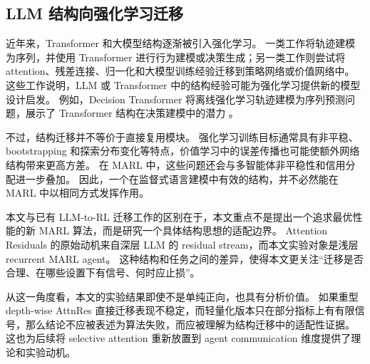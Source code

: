 \subsection{LLM 结构向强化学习迁移}

近年来，Transformer 和大模型结构逐渐被引入强化学习。
一类工作将轨迹建模为序列，并使用 Transformer 进行行为建模或决策生成；另一类工作则尝试将 attention、残差连接、归一化和大模型训练经验迁移到策略网络或价值网络中。
这些工作说明，LLM 或 Transformer 中的结构经验可能为强化学习提供新的模型设计启发。
例如，Decision Transformer 将离线强化学习轨迹建模为序列预测问题，展示了 Transformer 结构在决策建模中的潜力 \cite{chen2021decisiontransformer}。

不过，结构迁移并不等价于直接复用模块。
强化学习训练目标通常具有非平稳、bootstrapping 和探索分布变化等特点，价值学习中的误差传播也可能使额外网络结构带来更高方差。
在 MARL 中，这些问题还会与多智能体非平稳性和信用分配进一步叠加。
因此，一个在监督式语言建模中有效的结构，并不必然能在 MARL 中以相同方式发挥作用。

本文与已有 LLM-to-RL 迁移工作的区别在于，本文重点不是提出一个追求最优性能的新 MARL 算法，而是研究一个具体结构思想的适配边界。
Attention Residuals 的原始动机来自深层 LLM 的 residual stream，而本文实验对象是浅层 recurrent MARL agent。
这种结构和任务之间的差异，使得本文更关注“迁移是否合理、在哪些设置下有信号、何时应止损”。

从这一角度看，本文的实验结果即使不是单纯正向，也具有分析价值。
如果重型 depth-wise AttnRes 直接迁移表现不稳定，而轻量化版本只在部分指标上有有限信号，那么结论不应被表述为算法失败，而应被理解为结构迁移中的适配性证据。
这也为后续将 selective attention 重新放置到 agent communication 维度提供了理论和实验动机。
